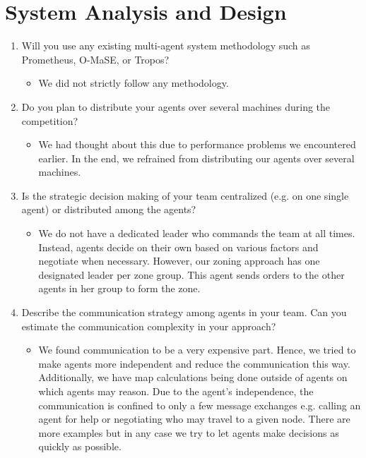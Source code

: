 \documentclass{llncs}
\begin{document}
\begin{enumerate}
\end{enumerate}

\section*{System Analysis and Design}

\begin{enumerate}
  \item Will you use any existing multi-agent system methodology such as Prometheus, O-MaSE, or Tropos?
   \begin{itemize}
     \item We did not strictly follow any methodology.
   \end{itemize}
 \item Do you plan to distribute your agents over several machines during the competition?
   \begin{itemize}
     \item We had thought about this due to performance problems we encountered earlier. In the end, we refrained from distributing our agents over several machines.
   \end{itemize}
 \item Is the strategic decision making of your team centralized (e.g. on one single agent) or distributed among the agents?
   \begin{itemize}
     \item We do not have a dedicated leader who commands the team at all times. Instead, agents decide on their own based on various factors and negotiate when necessary. However, our zoning approach has one designated leader per zone group. This agent sends orders to the other agents in her group to form the zone.
   \end{itemize}
 \item Describe the communication strategy among agents in your team. Can you estimate the communication complexity in your approach?
   \begin{itemize}
     \item We found communication to be a very expensive part. Hence, we tried to make agents more independent and reduce the communication this way. Additionally, we have map calculations being done outside of agents on which agents may reason. Due to the agent's independence, the communication is confined to only a few message exchanges e.g. calling an agent for help or negotiating who may travel to a given node. There are more examples but in any case we try to let agents make decisions as quickly as possible.
   \end{itemize}
\end{enumerate}
\end{document}
